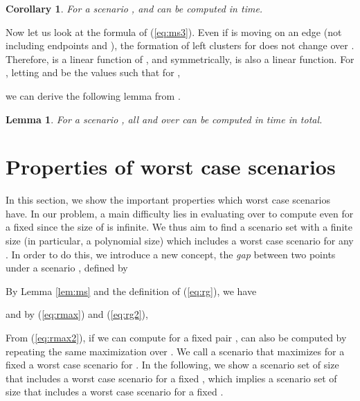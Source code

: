 \documentclass[a4paper]{llncs}
\newtheorem{lem}{Lemma}
\newtheorem{coro}{Corollary}
\begin{document}
\begin{coro}
For a scenario ,  and  can be computed in  time.
\label{coro:mst}
\end{coro}



Now let us look at the formula of (\ref{eq:ms3}).
Even if  is moving on an edge  (not including endpoints  and ), the formation of left clusters for  does not change over .
Therefore,  is a linear function of , and symmetrically,  is also a linear function.
For , letting  and  be the values such that for ,

we can derive the following lemma from \cite{hgk14_2,hgk14_4}.

\begin{lem}
For a scenario , all  and  over  can be computed in  time in total.
\label{lem:abt}
\end{lem}





\section{Properties of worst case scenarios}
\label{sec:pwcs}

In this section, we show the important properties which worst case scenarios have.
In our problem, a main difficulty lies in evaluating  over  to compute  even for a fixed  since 
the size of  is infinite.
We thus aim to find a scenario set with a finite size (in particular, a polynomial size)
which includes a worst case scenario for any .
In order to do this, we introduce a new concept, the {\it gap} between two points  under a scenario , defined by

By Lemma \ref{lem:ms} and the definition of (\ref{eq:rg}), we have

and by (\ref{eq:rmax}) and (\ref{eq:rg2}),

From (\ref{eq:rmax2}), if we can compute  for a fixed pair ,
 can also be computed by repeating the same maximization over .
We call a scenario that maximizes  for a fixed  a worst case scenario for .
In the following, we show a scenario set of size  that includes a worst case scenario for a fixed ,
which implies a scenario set of size  that includes a worst case scenario for a fixed . 
\end{document}
